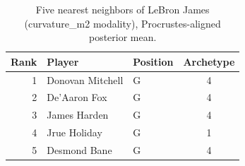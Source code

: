 \begin{table}[htbp]
  \centering\small
  \begin{tabular}{rllc}
    \toprule
    Rank & Player & Position & Archetype \\
    \midrule
    1 & Donovan Mitchell & G & 4 \\
    2 & De'Aaron Fox & G & 4 \\
    3 & James Harden & G & 4 \\
    4 & Jrue Holiday & G & 1 \\
    5 & Desmond Bane & G & 4 \\
    \bottomrule
  \end{tabular}
  \caption{Five nearest neighbors of LeBron James (curvature_m2 modality), Procrustes-aligned posterior mean.}
  \label{tab:LeBron_James_neighbors_curvature_m2}
\end{table}


